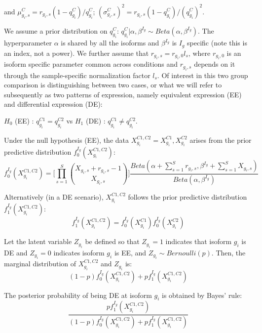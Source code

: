 \documentclass{article}
\begin{document}
\noindent and $\mu_{g_i,s}^C=r_{g_i,s} (1-q_{g_i}^C)/q_{g_i}^C$;
$(\sigma_{g_i,s}^C)^2=r_{g_i,s} (1-q_{g_i}^C)/(q_{g_i}^C)^2.$

\medskip

We assume a prior distribution on $q_{g_i}^C$: $q_{g_i}^C|\alpha, \beta^{I_g} \sim Beta(\alpha, \beta^{I_g})$.
The hyperparameter $\alpha$ is shared by all the isoforms and $\beta^{I_g}$ is $I_g$ specific (note this is an index, not a power).
We further assume that $r_{g_i,s}=r_{g_i,0} l_s$, where $r_{g_i,0}$ is an isoform specific 
parameter common across conditions and $r_{g_i,s}$ depends on it through the sample-specific normalization factor $l_s$.
Of interest in this two group comparison is distinguishing between two cases, or what we will refer to subsequently as
two patterns of expression, namely equivalent expression (EE) and differential expression (DE):
\begin{center}
$H_0$ (EE) : $q_{g_i}^{C1}=q_{g_i}^{C2}$  vs  $H_1$ (DE) : $q_{g_i}^{C1} \neq q_{g_i}^{C2}$.
\end{center}
Under the null hypothesis (EE), the data $X_{g_i}^{C1,C2} = X_{g_i}^{C1}, X_{g_i}^{C2}$ arises 
from the prior predictive distribution $f_0^{I_g}(X_{g_i}^{C1,C2})$:
\begin{equation}
f_0^{I_g}(X_{g_i}^{C1,C2})=\Bigg[\prod_{s=1}^S {X_{g_i,s}+r_{g_i,s}-1\choose X_{g_i,s}}\Bigg]
\frac{Beta(\alpha+\sum_{s=1}^S r_{g_i,s}, \beta^{I_g}+\sum_{s=1}^SX_{g_i,s} )}{Beta(\alpha, \beta^{I_g})}\label{eq:05}
\end{equation}

Alternatively (in a DE scenario), $X_{g_i}^{C1,C2}$ follows the prior predictive distribution $f_1^{I_g}(X_{g_i}^{C1,C2})$:
\begin{equation}
f_1^{I_g}(X_{g_i}^{C1,C2})=f_0^{I_g}(X_{g_i}^{C1})f_0^{I_g}(X_{g_i}^{C2}) \label{eq:06}
\end{equation}

Let the latent variable $Z_{g_i}$ be defined so that $Z_{g_i} = 1$ indicates that 
isoform $g_i$ is DE and $Z_{g_i} =  0$ indicates isoform $g_i$ is EE, and
$Z_{g_i} \sim Bernoulli(p)$.
Then, the marginal distribution of $X_{g_i}^{C1,C2}$ and $Z_{g_i}$ is:
\begin{equation}
(1-p)f_0^{I_g}(X_{g_i}^{C1,C2}) + pf_1^{I_g}(X_{g_i}^{C1,C2})\label{eq:07}
\end{equation}

\noindent The posterior probability of being DE at isoform $g_i$ is obtained by Bayes' rule:
\begin{equation}
\frac{pf_1^{I_g}(X_{g_i}^{C1,C2})}{(1-p)f_0^{I_g}(X_{g_i}^{C1,C2}) + pf_1^{I_g}(X_{g_i}^{C1,C2})}\label{eq:08}
\end{equation}
\end{document}
